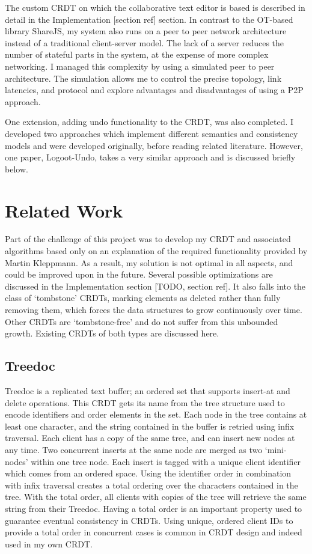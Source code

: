 \documentclass[12pt,a4paper,twoside,openright]{report}
\begin{document}
The custom CRDT on which the collaborative text editor is based is described in detail in the Implementation [section ref] section. In contrast to the OT-based library ShareJS, my system also runs on a peer to peer network architecture instead of a traditional client-server model. The lack of a server reduces the number of stateful parts in the system, at the expense of more complex networking. I managed this complexity by using a simulated peer to peer architecture. The simulation allows me to control the precise topology, link latencies, and protocol and explore advantages and disadvantages of using a P2P approach. 

One extension, adding undo functionality to the CRDT, was also completed. I developed two approaches which implement different semantics and consistency models and were developed originally, before reading related literature. However, one paper, Logoot-Undo, takes a very similar approach and is discussed briefly below.

\section{Related Work}

Part of the challenge of this project was to develop my CRDT and associated algorithms based only on an explanation of the required functionality provided by Martin Kleppmann. As a result, my solution is not optimal in all aspects, and could be improved upon in the future. Several possible optimizations are discussed in the Implementation section [TODO, section ref]. It also falls into the class of `tombstone' CRDTs, marking elements as deleted rather than fully removing them, which forces the data structures to grow continuously over time. Other CRDTs are `tombstone-free' and do not suffer from this unbounded growth. Existing CRDTs of both types are discussed here.

\subsection{Treedoc}

Treedoc \cite{preguica2009} is a replicated text buffer; an ordered set that supports insert-at and delete operations. This CRDT gets its name from the tree structure used to encode identifiers and order elements in the set. Each node in the tree contains at least one character, and the string contained in the buffer is retried using infix traversal. Each client has a copy of the same tree, and can insert new nodes at any time. Two concurrent inserts at the same node are merged as two `mini-nodes' within one tree node. Each insert is tagged with a unique client identifier which comes from an ordered space. Using the identifier order in combination with infix traversal creates a total ordering over the characters contained in the tree. With the total order, all clients with copies of the tree will retrieve the same string from their Treedoc. Having a total order is an important property used to guarantee eventual consistency in CRDTs. Using unique, ordered client IDs to provide a total order in concurrent cases is common in CRDT design and indeed used in my own CRDT.
\end{document}
